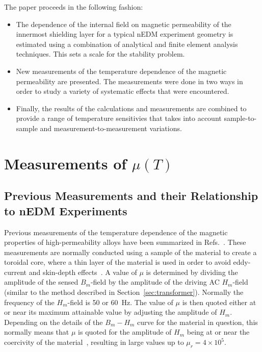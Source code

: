 \documentclass[review,number,sort&compress]{elsarticle}
\begin{document}
The paper proceeds in the following fashion:
\begin{itemize}
\item The dependence of the internal field on magnetic permeability of
  the innermost shielding layer for a typical nEDM experiment geometry
  is estimated using a combination of analytical and finite element
  analysis techniques.  This sets a scale for the stability problem.
\item New measurements of the temperature dependence of the magnetic
  permeability are presented.  The measurements were done in two ways
  in order to study a variety of systematic effects that were
  encountered.
\item Finally, the results of the calculations and measurements are
  combined to provide a range of temperature sensitivies that takes
  into account sample-to-sample and measurement-to-measurement
  variations.
\end{itemize}







\section{Measurements of $\mu(T)$\label{sec:tdep}}

\subsection{Previous Measurements and their Relationship to nEDM Experiments\label{sec:previousmeasurement}}

Previous measurements of the temperature dependence of the magnetic
properties of high-permeability alloys have been summarized in
Refs.~\cite{bib:couderchon,bib:bozorth,bib:pfeifer}.  These
measurements are normally conducted using a sample of the material to
create a toroidal core, where a thin layer of the material is used in
order to avoid eddy-current and skin-depth
effects~\cite{bib:pfeifer,bib:kruppvdm}.  A value of $\mu$ is
determined by dividing the amplitude of the sensed $B_m$-field by the
amplitude of the driving AC $H_m$-field (similar to the method
described in Section~\ref{sec:transformer}).  Normally the frequency
of the $H_m$-field is 50 or 60~Hz.  The value of $\mu$ is then quoted
either at or near its maximum attainable value by adjusting the
amplitude of $H_m$.  Depending on the details of the $B_m-H_m$ curve
for the material in question, this normally means that $\mu$ is quoted
for the amplitude of $H_m$ being at or near the coercivity of the
material~\cite{bib:couderchon,bib:kruppvdm}, resulting in large values
up to $\mu_r=4\times 10^5$.
\end{document}
